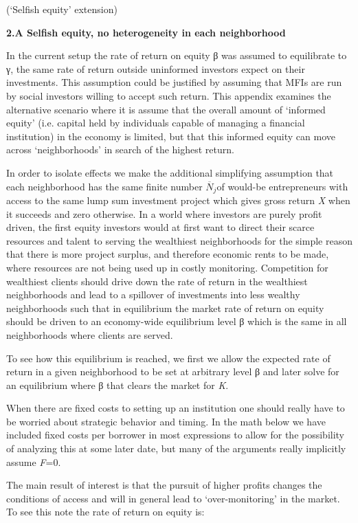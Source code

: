\documentclass[
]{article}
\begin{document}
(`Selfish equity' extension)

\textbf{2.A Selfish equity, no heterogeneity in each neighborhood}

In the current setup the rate of return on equity β was assumed to
equilibrate to γ, the same rate of return outside uninformed investors
expect on their investments. This assumption could be justified by
assuming that MFIs are run by social investors willing to accept such
return. This appendix examines the alternative scenario where it is
assume that the overall amount of `informed equity' (i.e. capital held
by individuals capable of managing a financial institution) in the
economy is limited, but that this informed equity can move across
`neighborhoods' in search of the highest return.

In order to isolate effects we make the additional simplifying
assumption that each neighborhood has the same finite number
\({\overline{N}}_{j}\)of would-be entrepreneurs with access to the same
lump sum investment project which gives gross return \emph{X} when it
succeeds and zero otherwise. In a world where investors are purely
profit driven, the first equity investors would at first want to direct
their scarce resources and talent to serving the wealthiest
neighborhoods for the simple reason that there is more project surplus,
and therefore economic rents to be made, where resources are not being
used up in costly monitoring. Competition for wealthiest clients should
drive down the rate of return in the wealthiest neighborhoods and lead
to a spillover of investments into less wealthy neighborhoods such that
in equilibrium the market rate of return on equity should be driven to
an economy-wide equilibrium level β which is the same in all
neighborhoods where clients are served.

To see how this equilibrium is reached, we first we allow the expected
rate of return in a given neighborhood to be set at arbitrary level β
and later solve for an equilibrium where β that clears the market for
\emph{K}.

When there are fixed costs to setting up an institution one should
really have to be worried about strategic behavior and timing. In the
math below we have included fixed costs per borrower in most expressions
to allow for the possibility of analyzing this at some later date, but
many of the arguments really implicitly assume \emph{F}=0.

The main result of interest is that the pursuit of higher profits
changes the conditions of access and will in general lead to
`over-monitoring' in the market. To see this note the rate of return on
equity is:
\end{document}
